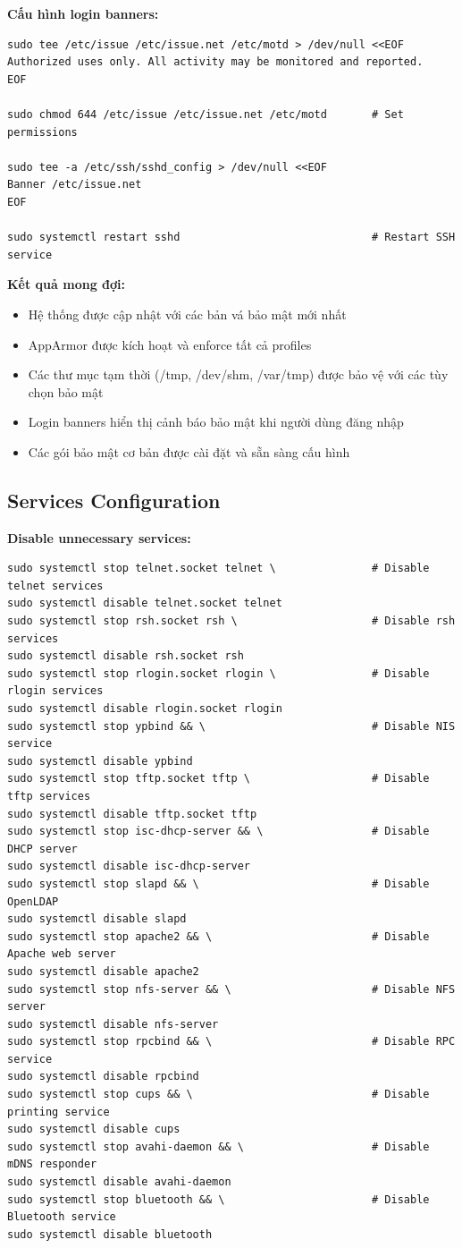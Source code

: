 \noindent \textbf{Cấu hình login banners:}
\begin{verbatim}
sudo tee /etc/issue /etc/issue.net /etc/motd > /dev/null <<EOF
Authorized uses only. All activity may be monitored and reported.
EOF

sudo chmod 644 /etc/issue /etc/issue.net /etc/motd       # Set permissions

sudo tee -a /etc/ssh/sshd_config > /dev/null <<EOF
Banner /etc/issue.net
EOF

sudo systemctl restart sshd                              # Restart SSH service
\end{verbatim}

\noindent \textbf{Kết quả mong đợi:}
\begin{itemize}
\item Hệ thống được cập nhật với các bản vá bảo mật mới nhất
\item AppArmor được kích hoạt và enforce tất cả profiles
\item Các thư mục tạm thời (/tmp, /dev/shm, /var/tmp) được bảo vệ với các tùy chọn bảo mật
\item Login banners hiển thị cảnh báo bảo mật khi người dùng đăng nhập
\item Các gói bảo mật cơ bản được cài đặt và sẵn sàng cấu hình
\end{itemize}

\subsection{Services Configuration}

\noindent \textbf{Disable unnecessary services:}
\begin{verbatim}
sudo systemctl stop telnet.socket telnet \               # Disable telnet services
sudo systemctl disable telnet.socket telnet
sudo systemctl stop rsh.socket rsh \                     # Disable rsh services
sudo systemctl disable rsh.socket rsh
sudo systemctl stop rlogin.socket rlogin \               # Disable rlogin services
sudo systemctl disable rlogin.socket rlogin
sudo systemctl stop ypbind && \                          # Disable NIS service
sudo systemctl disable ypbind
sudo systemctl stop tftp.socket tftp \                   # Disable tftp services
sudo systemctl disable tftp.socket tftp
sudo systemctl stop isc-dhcp-server && \                 # Disable DHCP server
sudo systemctl disable isc-dhcp-server
sudo systemctl stop slapd && \                           # Disable OpenLDAP
sudo systemctl disable slapd
sudo systemctl stop apache2 && \                         # Disable Apache web server
sudo systemctl disable apache2
sudo systemctl stop nfs-server && \                      # Disable NFS server
sudo systemctl disable nfs-server
sudo systemctl stop rpcbind && \                         # Disable RPC service
sudo systemctl disable rpcbind
sudo systemctl stop cups && \                            # Disable printing service
sudo systemctl disable cups
sudo systemctl stop avahi-daemon && \                    # Disable mDNS responder
sudo systemctl disable avahi-daemon
sudo systemctl stop bluetooth && \                       # Disable Bluetooth service
sudo systemctl disable bluetooth
\end{verbatim}

